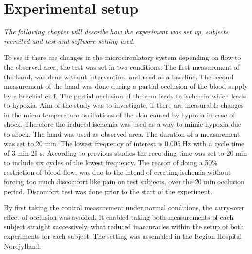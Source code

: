 \chapter{Experimental setup}

\textit{The following chapter will describe how the experiment was set up, subjects recruited and test and software setting used.} 


To see if there are changes in the microcirculatory system depending on flow to the observed area, the test was set in two conditions. The first measurement of the hand, was done without intervention, and used as a baseline. The second measurement of the hand was done during a partial occlusion of the blood supply by a brachial cuff. The partial occlusion of the arm leads to ischemia which leads to hypoxia\cite{martini2012}. Aim of the study was to investigate, if there are measurable changes in the micro temperature oscillations of the skin caused by hypoxia in case of shock. Therefore the induced ischemia was used as a way to mimic hypoxia due to shock. The hand was used as observed area. 
The duration of a measurement was set to 20 min. The lowest frequency of interest is $0.005$ Hz with a cycle time of 3 min 20 s. According to previous studies the recording time was set to 20 min to include six cycles of the lowest frequency.\cite{sagaidachnyi2014}
The reason of doing a 50\% restriction of blood flow, was due to the intend of creating ischemia without forcing too much discomfort like pain on test subjects, over the 20 min occlusion period. Discomfort test was done prior to the start of the experiment.

By first taking the control measurement under normal conditions, the carry-over effect of occlusion was avoided. It enabled taking both measurements of each subject straight successively, what reduced inaccuracies within the setup of both experiments for each subject. The setting was assembled in the Region Hospital Nordjylland.